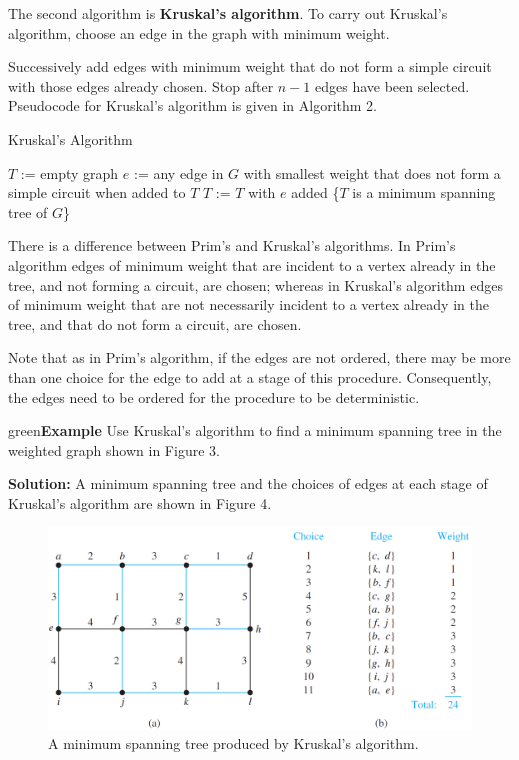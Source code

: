 \documentclass{article}
\newenvironment{example}{\begin{mybox}{green}{\textbf{Example}}}{\end{mybox}}
\begin{document}

The second algorithm is \textbf{Kruskal’s algorithm}. To carry out Kruskal’s algorithm, choose an edge in the graph with minimum weight.

Successively add edges with minimum weight that do not form a simple circuit with those edges already chosen. Stop after $n - 1$ edges have been selected. Pseudocode for Kruskal’s algorithm is given in Algorithm 2.

\begin{algorithm}[h!]
\caption{Kruskal’s Algorithm}
\begin{algorithmic}
\State $T$ := empty graph
\State $e$ := any edge in $G$ with smallest weight that does not form a simple circuit when added to $T$
\State $T$ := $T$ with $e$ added
\EndFor
\State {} \{$T$ is a minimum spanning tree of $G$\}
\EndProcedure
\end{algorithmic}
\end{algorithm}

There is a difference between Prim’s and Kruskal’s algorithms. In Prim’s algorithm edges of minimum weight that are incident to a vertex already in the tree, and not forming a circuit, are chosen; whereas in Kruskal’s algorithm edges of minimum weight that are not necessarily incident to a vertex already in the tree, and that do not form a circuit, are chosen. 

Note that as in Prim’s algorithm, if the edges are not ordered, there may be more than one choice for the edge to add at a stage of this procedure. Consequently, the edges need to be ordered for the procedure to be deterministic.

\begin{example}
Use Kruskal’s algorithm to find a minimum spanning tree in the weighted graph shown in Figure 3.

\textbf{Solution:}
A minimum spanning tree and the choices of edges at each stage of Kruskal’s algorithm are shown in Figure 4.
\end{example}

\begin{figure}[h!]
    \centering
    \includegraphics[width=.75\textwidth]{img/ch11.5-f5.png}
    \caption{A minimum spanning tree produced by Kruskal’s algorithm.}
    \label{fig:my_label}
\end{figure}
\end{document}

